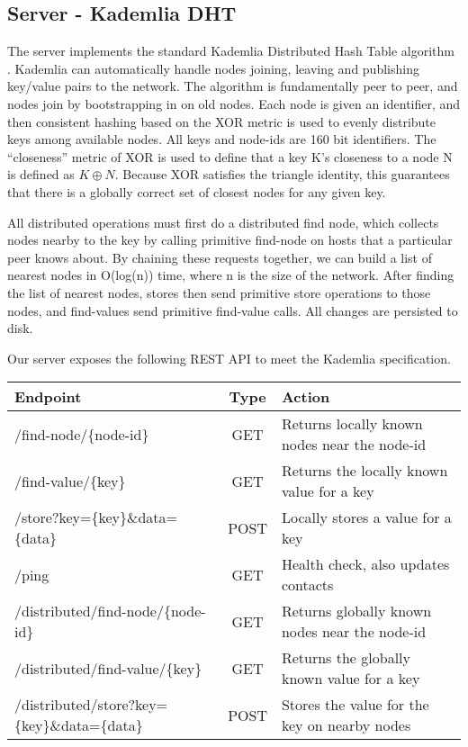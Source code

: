 \documentclass[a4paper,10pt]{article}
\begin{document}
\subsection{Server - Kademlia DHT}
The server implements the standard Kademlia Distributed Hash Table algorithm 
\cite{kademlia}.  Kademlia can automatically handle nodes joining, leaving and 
publishing key/value pairs to the network.  The algorithm is fundamentally peer 
to peer, and nodes join by bootstrapping in on old nodes.  Each node is given 
an identifier, and then consistent hashing based on the XOR metric is used to 
evenly distribute keys among available nodes.  All keys and node-ids are 160 
bit identifiers. The ``closeness''  metric of XOR is used to define that a key 
K's closeness to a node N is defined as $K \oplus N$.  Because XOR satisfies the 
triangle identity, this guarantees that there is a globally correct set of 
closest nodes for any given key.

All distributed operations must first do a distributed find node, which 
collects nodes nearby to the key by calling primitive find-node on hosts that a 
particular peer knows about.  By chaining these requests together, we can build 
a list of nearest nodes in O(log(n)) time, where n is the size of the network.  
After finding the list of nearest nodes, stores then send primitive store 
operations to those nodes, and find-values send primitive find-value calls.  
All changes are persisted to disk.

Our server exposes the following REST API to meet the Kademlia specification.  
\begin{center}
\begin{tabular}{| l | c | p{5cm} |}
\hline                       
\textbf{Endpoint} & \textbf{Type}& \textbf{Action}\\
\hline
/find-node/\{node-id\} & GET & Returns locally known nodes near the node-id\\
\hline
/find-value/\{key\} & GET & Returns the locally known value for a key\\
\hline
/store?key=\{key\}\&data=\{data\} & POST & Locally stores a value for a key\\
\hline
/ping & GET & Health check, also updates contacts\\
\hline
/distributed/find-node/\{node-id\} & GET & Returns globally known nodes near 
the node-id\\
\hline
/distributed/find-value/\{key\} & GET & Returns the globally known value for a 
key\\
\hline
/distributed/store?key=\{key\}\&data=\{data\} & POST & Stores the value for the
key on nearby nodes 

\end{tabular}
\end{center}
\end{document}
